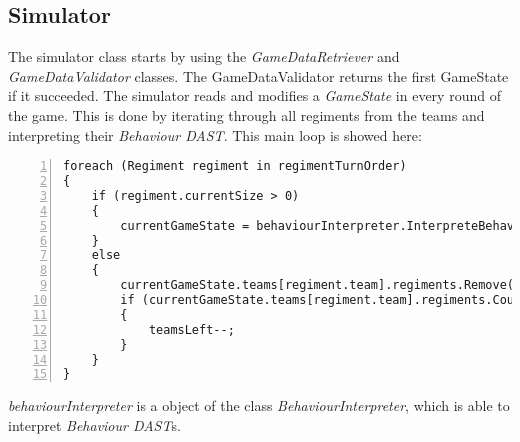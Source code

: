 \subsection{Simulator}
	The simulator class starts by using the {\it GameDataRetriever} and {\it GameDataValidator} classes. The GameDataValidator returns the first 
	GameState if it succeeded. The simulator reads and modifies a \textit{GameState} in every round of the game. This is done by iterating through all 
	regiments from the teams and interpreting their \textit{Behaviour DAST}. This main loop is showed here: \\
	\begin{lstlisting}[basicstyle=\small\sffamily,
		keywords={break,case,const,continue,default,else,enum,
		for,if,return,switch,while,do,long,void,int,float,double,
		char,struct,typedef,include,size\_t},
		keywordstyle={\color{blue}},
		comment={[l]{//}}, morecomment={[s]{/*}{*/}}, commentstyle=\itshape,
		columns={[l]flexible}, numbers=left, numberstyle=\tiny,
		frameround=fftt, frame=shadowbox, captionpos=b,
		caption={Main loop of the simulation},
		label=impl:regimentloop]
foreach (Regiment regiment in regimentTurnOrder)
{
	if (regiment.currentSize > 0)
	{
		currentGameState = behaviourInterpreter.InterpreteBehaviour(regiment, currentGameState);
	}
	else
	{
		currentGameState.teams[regiment.team].regiments.Remove(regiment);
		if (currentGameState.teams[regiment.team].regiments.Count <= 0)
		{
			teamsLeft--;
		}
	}
}
	\end{lstlisting}
	{\it behaviourInterpreter} is a object of the class {\it BehaviourInterpreter}, which is able to interpret \textit{Behaviour DAST}s.
	
